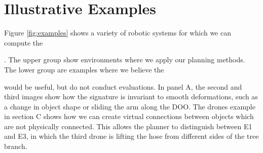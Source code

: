 \section{Illustrative Examples}


Figure \ref{fig:examples} shows a variety of robotic systems for which we can compute the \signature{}. The upper group show environments where we apply our planning methods. The lower group are examples where we believe the \signature{} would be useful, but do not conduct evaluations. In panel A, the second and third images show how the signature is invariant to smooth deformations, such as a change in object shape or sliding the arm along the DOO. The drones example in section C shows how we can create virtual connections between objects which are not physically connected. This allows the planner to distinguish between E1 and E3, in which the third drone is lifting the hose from different sides of the tree branch.